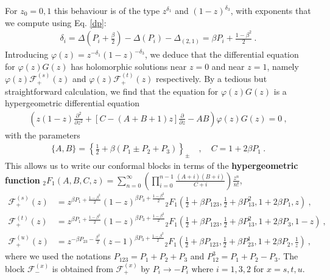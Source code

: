\documentclass[12pt, a4paper]{article}
\newcommand{\myindex}[1]{\textbf{\boldmath #1}}
\begin{document}
For $z_0=0,1$ this behaviour is of the type $z^{\delta_1}$ and $(1-z)^{\delta_3}$, with exponents that we compute using Eq. \eqref{dp}:
\begin{align}
 \delta_i=\Delta\left(P_i+\tfrac{\beta}{2}\right) - \Delta(P_i) -\Delta_{(2,1)} = \beta P_i + \tfrac{1-\beta^2}{2}\ .
\end{align}
Introducing $\varphi(z) = z^{-\delta_1}(1-z)^{-\delta_3}$, we deduce that the differential equation for $\varphi(z) G(z)$ has holomorphic solutions near $z=0$ and near $z=1$, namely $\varphi(z)\mathcal{F}^{(s)}_+(z)$ and $\varphi(z)\mathcal{F}^{(t)}_+(z)$ respectively. By a tedious but straightforward calculation, we find that the equation for $\varphi(z) G(z)$ is a hypergeometric differential equation
\begin{align}
 \left(z(1-z)\frac{\partial^2}{\partial z^2} + \left[C-(A+B+1)z\right]\frac{\partial}{\partial z} -AB\right) \varphi(z) G(z) = 0 \ ,
\end{align}
with the parameters 
\begin{align}
 \{A,B\} = \left\{\tfrac12+\beta(P_1\pm P_2+P_3)\right\}_\pm \quad , \quad  C=1+2\beta P_1\ .
\end{align}
This allows us to write our conformal blocks in terms of the \myindex{hypergeometric function}  ${}_2F_1(A,B,C,z)=\sum_{n=0}^\infty \left(\prod_{i=0}^{n-1}\frac{(A+i)(B+i)}{C+i}\right)\frac{z^n}{n!}$,
\begin{subequations}
\begin{align}
 \mathcal{F}_+^{(s)}(z) &= z^{\beta P_1 +\frac{1-\beta^2}{2}}(1-z)^{\beta P_3 + \frac{1-\beta^2}{2}} {}_2F_1\left(\tfrac12+ \beta P_{123},\tfrac12+\beta P_{13}^2,1+2\beta P_1,z\right) \ , 
 \\
 \mathcal{F}_+^{(t)}(z) &= z^{\beta P_1 +\frac{1-\beta^2}{2}}(1-z)^{\beta P_3 + \frac{1-\beta^2}{2}} {}_2F_1\left(\tfrac12+ \beta P_{123},\tfrac12+\beta P_{13}^2,1+2\beta P_3,1-z\right) \ , 
 \\
 \mathcal{F}_+^{(u)}(z) &= z^{-\beta P_{23} -\frac{\beta^2}{2}}(z-1)^{\beta P_3 + \frac{1-\beta^2}{2}} {}_2F_1\left(\tfrac12+ \beta P_{123},\tfrac12+\beta P_{23}^1,1+2\beta P_2,\tfrac{1}{z}\right) \ , 
\end{align}
\end{subequations}
where we used the notations $P_{123}=P_1+P_2+P_3$ and $P_{12}^3 = P_1+P_2-P_3$. The block $\mathcal{F}^{(x)}_-$ is obtained from $\mathcal{F}^{(x)}_+$ by $P_i\to -P_i$ where $i=1,3,2$ for $x=s,t,u$. 
\end{document}
